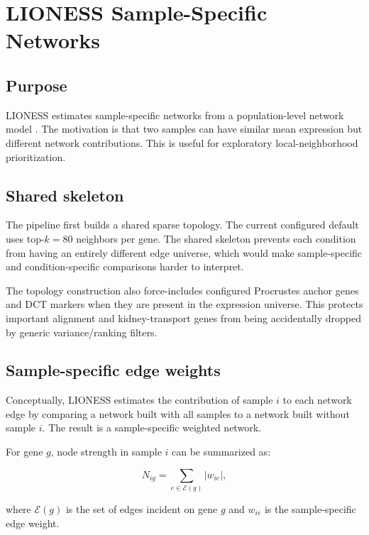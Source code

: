 \documentclass[11pt]{article}
\begin{document}
\section{LIONESS Sample-Specific Networks}

\subsection{Purpose}

LIONESS estimates sample-specific networks from a population-level network model \citep{kuijjer2019estimating}. The motivation is that two samples can have similar mean expression but different network contributions. This is useful for exploratory local-neighborhood prioritization.

\subsection{Shared skeleton}

The pipeline first builds a shared sparse topology. The current configured default uses top-$k=80$ neighbors per gene. The shared skeleton prevents each condition from having an entirely different edge universe, which would make sample-specific and condition-specific comparisons harder to interpret.

The topology construction also force-includes configured Procrustes anchor genes and DCT markers when they are present in the expression universe. This protects important alignment and kidney-transport genes from being accidentally dropped by generic variance/ranking filters.

\subsection{Sample-specific edge weights}

Conceptually, LIONESS estimates the contribution of sample $i$ to each network edge by comparing a network built with all samples to a network built without sample $i$. The result is a sample-specific weighted network.

For gene $g$, node strength in sample $i$ can be summarized as:

\begin{equation}
N_{ig}=\sum_{e\in \mathcal{E}(g)} |w_{ie}|,
\end{equation}

where $\mathcal{E}(g)$ is the set of edges incident on gene $g$ and $w_{ie}$ is the sample-specific edge weight.
\end{document}
